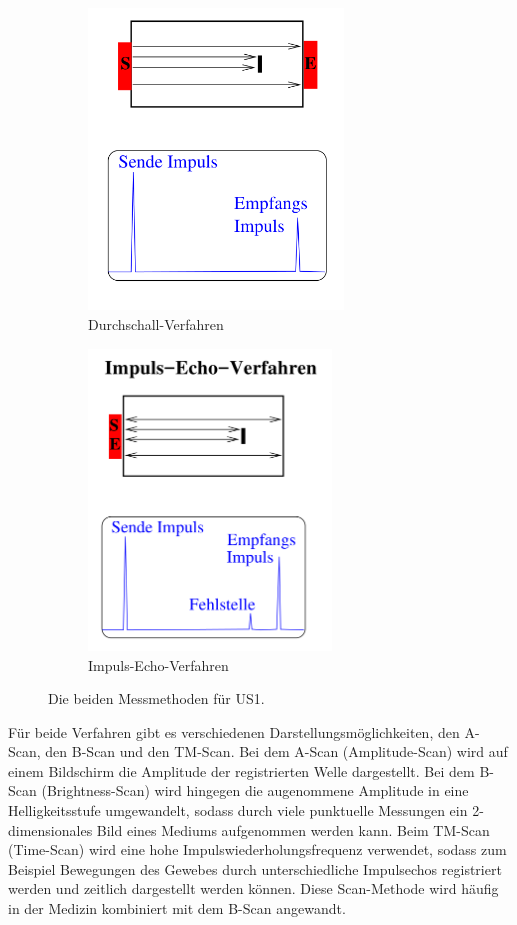 \begin{figure}
  \centering
  \begin{subfigure}{0.48\textwidth}
      \centering
      \includegraphics[height=8cm]{Pics/Durchschall.png}
      \caption{Durchschall-Verfahren}
      \label{fig:Durchschall}
  \end{subfigure}
  \begin{subfigure}{0.48\textwidth}
    \centering
      \includegraphics[height=8cm]{Pics/Impuls_Echo.png}
      \caption{Impuls-Echo-Verfahren}
      \label{fig:Impuls_Echo}
    \end{subfigure}
\caption{Die beiden Messmethoden für US1. \cite{anleitung01}}
\label{fig:Messmethoden}
\end{figure}

Für beide Verfahren gibt es verschiedenen Darstellungsmöglichkeiten, den A-Scan,
den B-Scan und den TM-Scan. Bei dem A-Scan (Amplitude-Scan) wird auf einem
Bildschirm die Amplitude der registrierten Welle dargestellt. Bei dem B-Scan
(Brightness-Scan) wird hingegen die augenommene Amplitude in eine Helligkeitsstufe
umgewandelt, sodass durch viele punktuelle Messungen ein 2-dimensionales Bild
eines Mediums aufgenommen werden kann. Beim TM-Scan (Time-Scan) wird eine hohe
Impulswiederholungsfrequenz verwendet, sodass zum Beispiel Bewegungen des Gewebes
durch unterschiedliche Impulsechos registriert werden und zeitlich dargestellt
werden können. Diese Scan-Methode wird häufig in der Medizin kombiniert mit dem
B-Scan angewandt.

